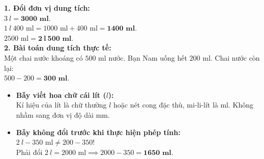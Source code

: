 \documentclass[11pt,a4paper]{article}
\begin{document}
\vspace{-2.5mm}
\noindent
\begin{minipage}[t]{0.49\textwidth}\vspace{0pt}
\begin{tcolorbox}[
  enhanced,
  colback=green!4!white,
  colframe=green!60!black,
  arc=2mm, boxrule=0.8pt,
  left=2mm, right=2mm, top=1.8mm, bottom=1.8mm,
  title={\footnotesize\bfseries\color{white}\faCheckCircle\ Ví dụ thực hành chuẩn mực}
]
{\footnotesize
\textbf{1. Đổi đơn vị dung tích:}\\
$3\ l = \mathbf{3000\text{ ml}}$.\\
$1\ l\ 400\text{ ml} = 1000\text{ ml} + 400\text{ ml} = \mathbf{1400\text{ ml}}$.\\
$2500\text{ ml} = \mathbf{2\ l\ 500\text{ ml}}$.\\
\textbf{2. Bài toán dung tích thực tế:}\\
Một chai nước khoáng có $500\text{ ml}$ nước. Bạn Nam uống hết $200\text{ ml}$. Chai nước còn lại:\\
$500 - 200 = \mathbf{300\text{ ml}}$.
}
\end{tcolorbox}
\end{minipage}
\hfill
\begin{minipage}[t]{0.49\textwidth}\vspace{0pt}
\begin{tcolorbox}[
  enhanced,
  colback=red!4!white,
  colframe=red!70!black,
  arc=2mm, boxrule=0.8pt,
  left=2mm, right=2mm, top=1.8mm, bottom=1.8mm,
  title={\footnotesize\bfseries\color{white}\faExclamationTriangle\ Mẹo tránh bẫy trắc nghiệm}
]
{\footnotesize
\begin{itemize}\setlength{\itemsep}{1.5pt}\setlength{\leftskip}{-2.5mm}
  \item \textbf{Bẫy viết hoa chữ cái lít ($l$):}\\
  Kí hiệu của lít là chữ thường $l$ hoặc nét cong đặc thù, mi-li-lít là $\text{ml}$. Không nhầm sang đơn vị độ dài $\text{mm}$.
  \item \textbf{Bẫy không đổi trước khi thực hiện phép tính:}\\
  $2\ l - 350\text{ ml} \ne 200 - 350$!\\
  Phải đổi $2\ l = 2000\text{ ml} \implies 2000 - 350 = \mathbf{1650\text{ ml}}$.
\end{itemize}
}
\end{tcolorbox}
\end{minipage}
\end{document}
